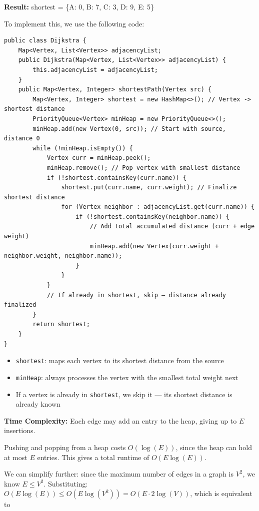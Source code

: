 \textbf{Result:} shortest = \{A: 0, B: 7, C: 3, D: 9, E: 5\}

To implement this, we use the following code:

\begin{verbatim}
public class Dijkstra {
    Map<Vertex, List<Vertex>> adjacencyList;
    public Dijkstra(Map<Vertex, List<Vertex>> adjacencyList) {
        this.adjacencyList = adjacencyList;
    }
    public Map<Vertex, Integer> shortestPath(Vertex src) {
        Map<Vertex, Integer> shortest = new HashMap<>(); // Vertex -> shortest distance
        PriorityQueue<Vertex> minHeap = new PriorityQueue<>();
        minHeap.add(new Vertex(0, src)); // Start with source, distance 0
        while (!minHeap.isEmpty()) {
            Vertex curr = minHeap.peek();
            minHeap.remove(); // Pop vertex with smallest distance
            if (!shortest.containsKey(curr.name)) {
                shortest.put(curr.name, curr.weight); // Finalize shortest distance
                for (Vertex neighbor : adjacencyList.get(curr.name)) {
                    if (!shortest.containsKey(neighbor.name)) {
                        // Add total accumulated distance (curr + edge weight)
                        minHeap.add(new Vertex(curr.weight + neighbor.weight, neighbor.name));
                    }
                }
            }
            // If already in shortest, skip — distance already finalized
        }
        return shortest;
    }
}
\end{verbatim}

\begin{itemize}
  \item \texttt{shortest}: maps each vertex to its shortest distance from the source
  \item \texttt{minHeap}: always processes the vertex with the smallest total weight next
  \item If a vertex is already in \texttt{shortest}, we skip it --- its shortest distance is already known
\end{itemize}
\textbf{Time Complexity:}
Each edge may add an entry to the heap, giving up to $E$ insertions. 

Pushing and popping from a heap costs $O(\log (E))$, since the heap can hold at most $E$ entries. This gives a total runtime of $O(E \log (E))$.

We can simplify further: since the maximum number of edges in a graph is $V^2$, we know $E \leq V^2$. Substituting: $O(E \log (E)) \leq O(E \log (V^2)) = O(E \cdot 2\log (V))$, which is equivalent to

